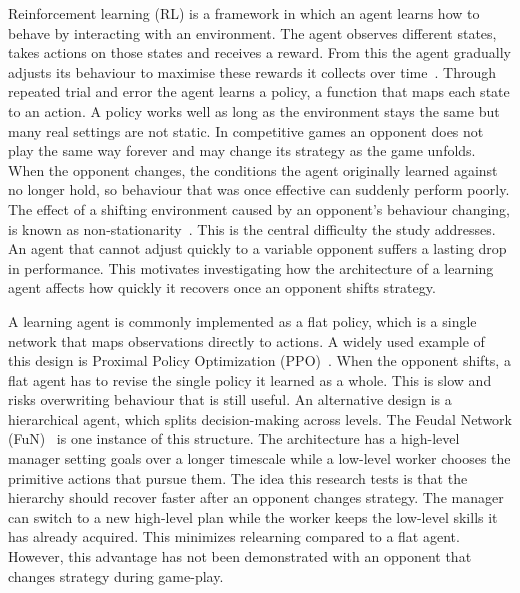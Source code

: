 \documentclass[sigconf,nonacm]{acmart}
\begin{document}
Reinforcement learning (RL) is a framework in which an agent learns how to
behave by interacting with an environment. The agent observes different states, takes actions on those states and receives a reward. From this the agent gradually adjusts its behaviour to maximise these rewards it collects over time~\cite{sutton2018reinforcement}. Through repeated trial and
error the agent learns a policy, a function that maps each state to an action. A policy works well as long as the environment stays the same but many real settings are not static. In
competitive games an opponent does not play the same way forever and may change its strategy as the game unfolds. When the opponent changes, the
conditions the agent originally learned against no longer hold, so behaviour
that was once effective can suddenly perform poorly. The effect of a shifting environment caused by an opponent's behaviour changing, is
known as non-stationarity~\cite{padakandla2022survey}. This is the central difficulty the study addresses. An agent that cannot adjust quickly to a variable opponent suffers a lasting drop in performance. This motivates investigating how the
architecture of a learning agent affects how quickly it recovers once an
opponent shifts strategy.

A learning agent is commonly implemented as a flat policy, which is a single network that maps observations directly to actions. A widely used example of this design is Proximal Policy Optimization (PPO)~\cite{schulman2015trust}. When the opponent shifts, a flat agent has to
revise the single policy it learned as a whole. This is slow and risks overwriting
behaviour that is still useful. An alternative design is a hierarchical agent, which
splits decision-making across levels. The Feudal Network (FuN)~\cite{dayan1993feudal, vezhnevets2017feudal} is one instance of this structure. The architecture has a high-level manager setting goals over a longer timescale while a low-level worker chooses the primitive actions that pursue them. The idea this research tests is that the hierarchy should recover faster after an opponent changes strategy. The manager can switch to a new high-level plan while the worker keeps the low-level skills it has already acquired. This minimizes relearning compared to a flat agent. However, this advantage has not been demonstrated with an opponent that changes strategy during game-play.
\end{document}
